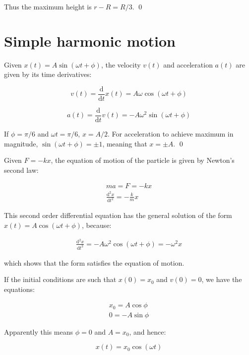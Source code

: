 \documentclass[12pt]{article}
\begin{document}
Thus the maximum height is $r - R = \boxed{R/3}$.
\qed


\pagebreak
\section*{Simple harmonic motion}


Given $x(t) = A \sin{(\omega t + \phi)}$, the velocity $v(t)$ and acceleration $a(t)$ are given by its time derivatives:

\begin{equation}
    v(t) = \frac{\mathrm{d}}{\mathrm{d}t} x(t) = A \omega \cos{(\omega t + \phi)}
\end{equation}

\begin{equation}
    a(t) = \frac{\mathrm{d}}{\mathrm{d}t} v(t) = - A \omega^{2} \sin{(\omega t + \phi)}
\end{equation}

If $\phi = \pi/6$ and $\omega t = \pi/6$, $\boxed{x = A/2}$. For acceleration to achieve maximum in magnitude, $\sin{(\omega t + \phi)} = \pm 1$, meaning that $\boxed{x = \pm A}$.
\qed


Given $F = -kx$, the equation of motion of the particle is given by Newton's second law:

\begin{equation}
\begin{split}
    ma = F = -kx \\
    \frac{\mathrm{d}^{2}x}{\mathrm{d}t^{2}} = - \frac{k}{m} x
\end{split}
\end{equation}

This second order differential equation has the general solution of the form $x(t) = A\cos{(\omega t + \phi)}$, because:

\begin{equation}
\begin{split}
    \frac{\mathrm{d}^{2}x}{\mathrm{d}t^{2}} = - A \omega^{2} \cos{(\omega t + \phi)} = - \omega^{2} x
\end{split}
\end{equation}

which shows that the form satisfies the equation of motion.

If the initial conditions are such that $x(0) = x_{0}$ and $v(0) = 0$, we have the equations:

\begin{equation}
\begin{split}
    x_{0} = A\cos{\phi}\\
    0 = -A\sin{\phi}
\end{split}
\end{equation}

Apparently this means $\phi = 0$ and $A = x_{0}$, and hence:

\begin{equation}
    \boxed{x(t) = x_{0}\cos{(\omega t)}}
\end{equation}
\end{document}

